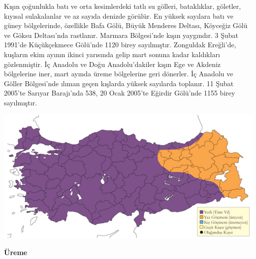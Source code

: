 \documentclass[
  letterpaper,
  DIV=11,
  numbers=noendperiod]{scrreprt}
\begin{document}
Kışın çoğunlukla batı ve orta kesimlerdeki tatlı su gölleri,
bataklıklar, göletler, kıyısal sulakalanlar ve az sayıda denizde
görülür. En yüksek sayılara batı ve güney bölgelerinde, özellikle Bafa
Gölü, Büyük Menderes Deltası, Köyceğiz Gölü ve Göksu Deltası'nda
rastlanır. Marmara Bölgesi'nde kışın yaygındır. 3 Şubat 1991'de
Küçükçekmece Gölü'nde 1120 birey sayılmıştır. Zonguldak Ereğli'de,
kuşların ekim ayının ikinci yarısında gelip mart sonuna kadar kaldıkları
gözlenmiştir. İç Anadolu ve Doğu Anadolu'dakiler kışın Ege ve Akdeniz
bölgelerine iner, mart ayında üreme bölgelerine geri dönerler. İç
Anadolu ve Göller Bölgesi'nde ılıman geçen kışlarda yüksek sayılarda
toplanır. 11 Şubat 2005'te Sarıyar Barajı'nda 538, 20 Ocak 2005'te
Eğirdir Gölü'nde 1155 birey sayılmıştır.

\includegraphics{images/harita_Page_051.png}

\textbf{Üreme}
\end{document}
